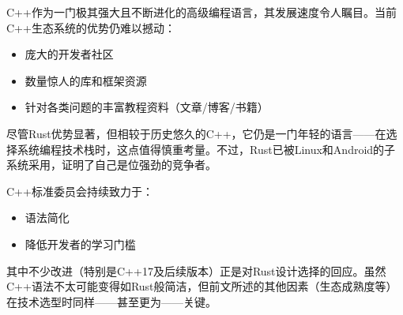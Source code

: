 C++作为一门极其强大且不断进化的高级编程语言，其发展速度令人瞩目。当前C++生态系统的优势仍难以撼动：

\begin{itemize}
\item 
庞大的开发者社区

\item 
数量惊人的库和框架资源

\item 
针对各类问题的丰富教程资料（文章/博客/书籍）
\end{itemize}

尽管Rust优势显著，但相较于历史悠久的C++，它仍是一门年轻的语言——在选择系统编程技术栈时，这点值得慎重考量。不过，Rust已被Linux和Android的子系统采用，证明了自己是位强劲的竞争者。

C++标准委员会持续致力于：

\begin{itemize}
\item 
语法简化

\item 
降低开发者的学习门槛
\end{itemize}

其中不少改进（特别是C++17及后续版本）正是对Rust设计选择的回应。虽然C++语法不太可能变得如Rust般简洁，但前文所述的其他因素（生态成熟度等）在技术选型时同样——甚至更为——关键。
